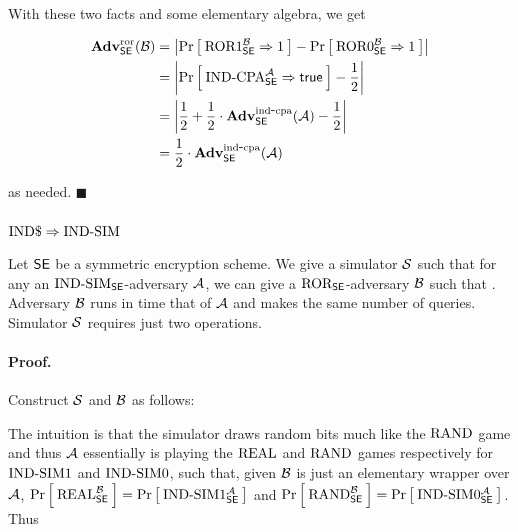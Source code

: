 With these two facts and some elementary algebra, we get

\begin{align*}
\mathbf{Adv}^{\mathrm{ror}}_{{\mathsf{SE}}}({\mathcal B}) 
    &= \left|\Pr\left[\: \textnormal{ROR}1_{\mathsf{SE}}^{\mathcal B}\Rightarrow 1 \:\right] -
                                \Pr\left[\: \textnormal{ROR}0_{\mathsf{SE}}^{\mathcal B}\Rightarrow 1 \:\right]\right|\\
    &= \left|\Pr\left[\: \textnormal{IND-CPA}_{\mathsf{SE}}^{\mathcal A}\Rightarrow\mathsf{true} \:\right] - \frac{1}{2}\right|\\
    &= \left|\frac{1}{2} +
    \frac{1}{2}\cdot\mathbf{Adv}^{\mathrm{ind\mbox{-} cpa}}_{{\mathsf{SE}}}({\mathcal A}) - \frac{1}{2}\right|\\
    &= \frac{1}{2}\cdot\mathbf{Adv}^{\mathrm{ind\mbox{-} cpa}}_{{\mathsf{SE}}}({\mathcal A})
\end{align*}

as needed. $\blacksquare$

\subsubsection*{$\textnormal{IND\$} \Rightarrow \textnormal{IND-SIM}$}

\begin{theorem*}
Let ${\mathsf{SE}}$ be a symmetric encryption scheme. We give a simulator ${\cal S}$ such
that for any  an
$\textnormal{IND-SIM}_{\mathsf{SE}}$-adversary ${\mathcal A}$, we can give 
a $\textnormal{ROR}_{\mathsf{SE}}$-adversary ${\mathcal B}$ such that
\bnm
  \AdvINDSIM{\SE,\simu}{\advA} \le \AdvROR{\SE}{\advB} \;.
\enm
Adversary ${\mathcal B}$ runs in time that of ${\mathcal A}$ and makes the same number of
queries. Simulator ${\cal S}$ requires just two operations.
\end{theorem*}

\paragraph{Proof.}

Construct ${\cal S}$ and ${\mathcal B}$ as follows:



The intuition is that the simulator draws random bits much like the
$\textnormal{RAND}$ game and thus ${\mathcal A}$  essentially is playing the
$\textnormal{REAL}$ and $\textnormal{RAND}$ games respectively for
$\textnormal{IND-SIM}1$ and $\textnormal{IND-SIM}0$, such that, given ${\mathcal B}$ is just an elementary
wrapper over ${\mathcal A}$,
$\Pr\left[\: \textnormal{REAL}_{\textnormal{\textsf{SE}}}^{{\mathcal B}} \:\right] = \Pr\left[\: \textnormal{IND-SIM}1_{\textnormal{\textsf{SE}}}^{{\mathcal A}} \:\right]$
and
$\Pr\left[\: \textnormal{RAND}_{\textnormal{\textsf{SE}}}^{{\mathcal B}} \:\right] = \Pr\left[\: \textnormal{IND-SIM}0_{\textnormal{\textsf{SE}}}^{{\mathcal A}} \:\right]$.
Thus

